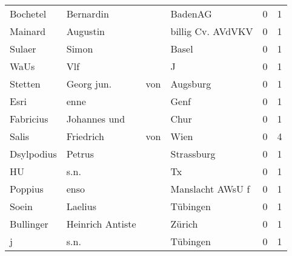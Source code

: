 \begin{center}
\begin{tiny}
\begin{longtabu}{llllrr}
                 Bochetel &                          Bernardin &             &                                     BadenAG &          0 &         1 \\
                  Mainard &                           Augustin &             &                           billig Cv. AVdVKV &          0 &         1 \\
                   Sulaer &                              Simon &             &                                       Basel &          0 &         1 \\
                     WaUs &                                Vlf &             &                                           J &          0 &         1 \\
                  Stetten &                        Georg  jun. &         von &                                    Augsburg &          0 &         1 \\
                     Esri &                               enne &             &                                        Genf &          0 &         1 \\
                Fabricius &                       Johannes und &             &                                        Chur &          0 &         1 \\
                    Salis &                          Friedrich &         von &                                        Wien &          0 &         4 \\
               Dsylpodius &                             Petrus &             &                                  Strassburg &          0 &         1 \\
                       HU &                               s.n. &             &                                          Tx &          0 &         1 \\
                  Poppius &                               enso &             &                            Manslacht AWsU f &          0 &         1 \\
                    Soein &                            Laelius &             &                                    Tübingen &          0 &         1 \\
                Bullinger &                   Heinrich Antiste &             &                                      Zürich &          0 &         1 \\
                        j &                               s.n. &             &                                    Tübingen &          0 &         1 \\

\end{longtabu}
\end{tiny}
\end{center}
